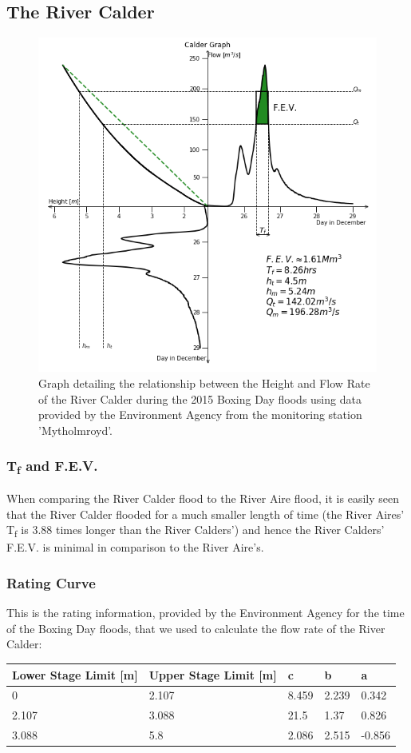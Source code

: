 \documentclass[11 pt, a4paper]{article}
\begin{document}
\subsection{The River Calder}
\begin{figure}[H]
\begin{center}
\includegraphics[width=.5\linewidth]{Calder-Quadrant_Graph.png}
\caption{Graph detailing the relationship between the Height and Flow Rate of the River Calder during the 2015 Boxing Day floods using data provided by the Environment Agency from the monitoring station 'Mytholmroyd'.}
\end{center}
\end{figure}
\subsubsection{T\textsubscript{f} and F.E.V.}
When comparing the River Calder flood to the River Aire flood, it is easily seen that the River Calder flooded for a much smaller length of time (the River Aires' T\textsubscript{f} is 3.88 times longer than the River Calders') and hence the River Calders' F.E.V. is minimal in comparison to the River Aire's.
\subsubsection{Rating Curve}
This is the rating information, provided by the Environment Agency for the time of the Boxing Day floods, that we used to calculate the flow rate of the River Calder:
\begin{center}
\begin{tabular}{|l|l|l|l|l|}
\hline
Lower Stage Limit {[}m{]} & Upper Stage Limit {[}m{]} & c & b & a \\
\hline
0 & 2.107 & 8.459 & 2.239 & 0.342 \\
2.107 & 3.088 & 21.5 & 1.37 & 0.826 \\
3.088 & 5.8 & 2.086 & 2.515 & -0.856 \\
\hline
\end{tabular}
\end{center}
\end{document}
